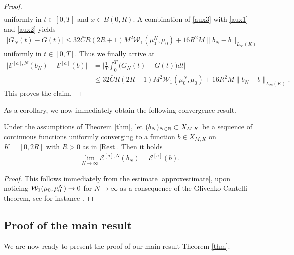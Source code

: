 \begin{proof}
\begin{align}
	\end{align}
	uniformly in $t \in [0,T]$ and $x \in B(0,R)$. A combination of \eqref{aux3} with \eqref{aux1} and
	\eqref{aux2} yields
	\begin{align*}
		|G_N(t)-G(t)|
			\leq 32\overline{C}R(2R+1)M^2 \mathcal{W}_1(\mu_0^N,\mu_0)+16R^2M\| b_{N}-b\|_{L_\infty(K)}
	\end{align*}
	uniformly in $t \in [0,T]$. Thus we finally arrive at
	\begin{align*}
		\bigl|\mathcal E^{[a],N}(b_N)-\mathcal E^{[a]}(b)\bigr|
			&=\biggl|\frac{1}{T}\int^T_0\bigl(G_N(t)-G(t)\bigr)dt\biggr|\\
			&\leq 32\overline{C}R(2R+1)M^2 \mathcal{W}_1(\mu_0^N,\mu_0)+16R^2M\| b_{N}-b\|_{L_\infty(K)}.
	\end{align*}
	This proves the claim.

\end{proof}









As a corollary, we now immediately obtain the following convergence result.

\begin{lemma}\label{lemma-semicontinuous-1}
	Under the assumptions of Theorem \ref{thm}, let $(b_N)_{N \in \mathbb{N}}\subset X_{M,K}$ be a sequence of continuous functions
	uniformly converging to a function $b \in X_{M,K}$ on $K=[0,2R]$  with $R>0$ as in \eqref{Rest}.
	Then it holds
	\begin{align*}
		\lim_{N\rightarrow\infty} \mathcal E^{[a],N}(b_{N})= \mathcal E^{[a]}(b).
	\end{align*}
\end{lemma}

\begin{proof}
	This follows immediately from the estimate \eqref{approxestimate}, upon noticing
	$\mathcal{W}_1(\mu_0,\mu^N_0) \rightarrow 0$ for $N \rightarrow \infty$ as a consequence of the Glivenko-Cantelli theorem,
see for instance \cite[Lemma 3.3]{fornahuetter}.
\end{proof}

\subsection{Proof of the main result}

We are now ready to present the proof of our main result Theorem \ref{thm}.


